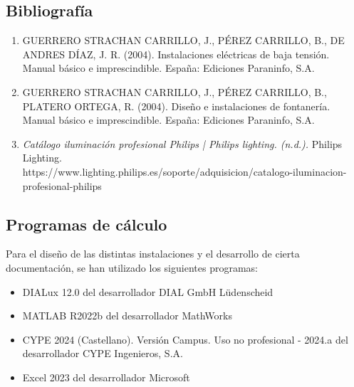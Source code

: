 \documentclass[../main.tex]{subfiles}
\begin{document}
\subsection{Bibliografía}
\begin{enumerate}
    \item GUERRERO STRACHAN CARRILLO, J., PÉREZ CARRILLO, B., DE ANDRES DÍAZ, J. R. (2004). Instalaciones eléctricas de baja tensión. Manual básico e imprescindible. España: Ediciones Paraninfo, S.A. 
    \item GUERRERO STRACHAN CARRILLO, J., PÉREZ CARRILLO, B., PLATERO ORTEGA, R. (2004). Diseño e instalaciones de fontanería. Manual básico e imprescindible. España: Ediciones Paraninfo, S.A. 
    \item \textit{Catálogo iluminación profesional Philips | Philips lighting. (n.d.).} Philips Lighting. \\ https://www.lighting.philips.es/soporte/adquisicion/catalogo-iluminacion-profesional-philips    
\end{enumerate}

\subsection{Programas de cálculo}
Para el diseño de las distintas instalaciones y el desarrollo de cierta documentación, se han utilizado los siguientes programas:
\begin{itemize}
    \item DIALux 12.0 del desarrollador DIAL GmbH Lüdenscheid
    \item MATLAB R2022b del desarrollador MathWorks
    \item CYPE 2024 (Castellano). Versión Campus. Uso no profesional - 2024.a del desarrollador CYPE Ingenieros, S.A.
    \item Excel 2023 del desarrollador Microsoft
\end{itemize}
\end{document}
